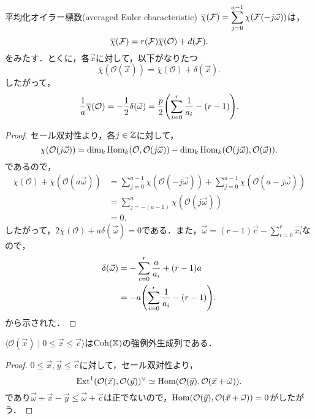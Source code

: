\begin{thm}
	平均化オイラー標数(averaged Euler characteristic) $\displaystyle\overline{\chi}({\mathcal F}) = \sum_{j=0}^{a-1}\chi({\mathcal F}(-j\vec{\omega}))$は，
\[\overline{\chi}({\mathcal F}) = r({\mathcal F})\overline{\chi}(\mathcal{O}) + d({\mathcal F}).\]
をみたす．とくに，各$\vec{x}$に対して，以下がなりたつ
\[\overline{\chi}(\mathcal{O}(\vec{x})) = \overline{\chi}(\mathcal{O}) + \delta(\vec{x}).\]
したがって，
\[\frac{1}{a}\overline{\chi}(\mathcal{O}) = -\frac{1}{2}\delta(\vec{\omega}) = \frac{p}{2}\qty(\sum_{i=0}^r\frac{1}{a_i} - (r-1)) .\]
\end{thm}
\begin{proof}
	セール双対性より，各$j\in{\mathbb Z}$に対して，
\[\chi(\mathcal{O}(j\vec{\omega})) = \dim_k\operatorname{\mathrm{Hom}}_{k}(\mathcal{O},\mathcal{O}(j\vec{\omega})) - \dim_k\operatorname{\mathrm{Hom}}_{k}(\mathcal{O}(j\vec{\omega}),\mathcal{O}(\vec{\omega})).\]
であるので，
\begin{align*}
	\overline{\chi}(\mathcal{O}) + \overline{\chi}(\mathcal{O}(a\vec{\omega})) &= \sum_{j=0}^{a-1}\chi(\mathcal{O}(-j\vec{\omega})) +\sum_{j=0}^{a-1}\chi(\mathcal{O}(a-j\vec{\omega}))\\
																																						 &= \sum_{j=-(a-1)}^{a}\chi(\mathcal{O}(j\vec{\omega}))\\
																																						 &= 0.
\end{align*}
したがって，$2\overline{\chi}(\mathcal{O}) + a\delta(\vec{\omega}) = 0$である．また，$\vec{\omega} = (r-1)\vec{c} - \sum_{i=0}^r\vec{x_i}$なので，
\begin{align*}
	\delta(\vec{\omega}) &= -\sum_{i=0}^r\frac{a}{a_i} +(r-1)a\\
											 &= -a\qty(\sum_{i=0}^r\frac{1}{a_i} - (r-1)).
\end{align*}
 から示された．
\end{proof}

\begin{lemm}\label{lemm:exceptional object}
	$\langle\mathcal{O}(\vec{x}) \mid 0\le \vec{x}\le \vec{c}\rangle$は$\operatorname{\mathrm{Coh}}({\mathbb X})$の強例外生成列である．
\end{lemm}
\begin{proof}
	$0\le \vec{x},\vec{y}\le \vec{c}$に対して，セール双対性より，
	\[\operatorname{\mathrm{Ext}}^1(\mathcal{O}(\vec{x}),\mathcal{O}(\vec{y}))^\vee \simeq \operatorname{\mathrm{Hom}}(\mathcal{O}(\vec{y}),\mathcal{O}(\vec{x}+\vec{\omega})).\]
	であり$\vec{\omega} +\vec{x} - \vec{y}\le\vec{\omega} + \vec{c}$は正でないので，$\operatorname{\mathrm{Hom}}(\mathcal{O}(\vec{y}),\mathcal{O}(\vec{x}+\vec{\omega})) = 0$がしたがう．
\end{proof}


